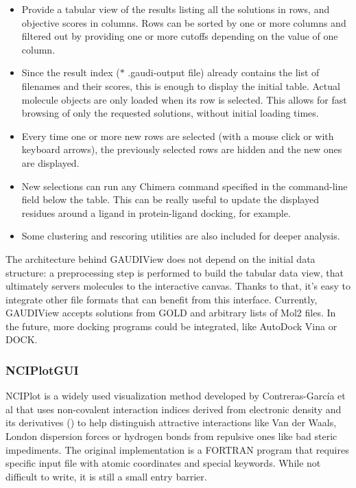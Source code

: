 \begin{itemize}
	\item Provide a tabular view of the results listing all the solutions in rows, and objective scores in columns. Rows can be sorted by one or more columns and filtered out by providing one or more cutoffs depending on the value of one column.

	\item Since the result index ($\ast$ .gaudi-output file) already contains the list of filenames and their scores, this is enough to display the initial table. Actual molecule objects are only loaded when its row is selected. This allows for fast browsing of only the requested solutions, without initial loading times.

	\item Every time one or more new rows are selected (with a mouse click or with keyboard arrows), the previously selected rows are hidden and the new ones are displayed.

	\item New selections can run any Chimera command specified in the command-line field below the table. This can be really useful to update the displayed residues around a ligand in protein-ligand docking, for example.

	\item Some clustering and rescoring utilities are also included for deeper analysis.
\end{itemize}

The architecture behind GAUDIView does not depend on the initial data structure: a preprocessing step is performed to build the tabular data view, that ultimately servers molecules to the interactive canvas. Thanks to that, it’s easy to integrate other file formats that can benefit from this interface. Currently, GAUDIView accepts solutions from GOLD and arbitrary lists of Mol2 files. In the future, more docking programs could be integrated, like AutoDock Vina or DOCK.

\subsubsection{NCIPlotGUI}
NCIPlot is a widely used visualization method developed by Contreras-García et al\cite{nciplot} that uses non-covalent interaction indices derived from electronic density and its derivatives () to help distinguish attractive interactions like Van der Waals, London dispersion forces or hydrogen bonds from repulsive ones like bad steric impediments. The original implementation is a FORTRAN program that requires specific input file with atomic coordinates and special keywords. While not difficult to write, it is still a small entry barrier.

